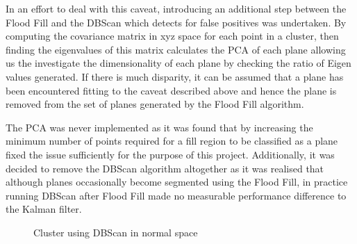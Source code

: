\documentclass[]{article}
\begin{document}
{In an effort to deal with this caveat, introducing an additional step between the Flood Fill and the DBScan which detects for false positives was undertaken. By computing the covariance matrix in xyz space for each point in a cluster, then finding the eigenvalues of this matrix calculates the PCA of each plane allowing us the investigate the dimensionality of each plane by checking the ratio of Eigen values generated. If there is much disparity, it can be assumed that a plane has been encountered fitting to the caveat described above and hence the plane is removed from the set of planes generated by the Flood Fill algorithm. 

The PCA was never implemented as it was found that by increasing the minimum number of points required for a fill region to be classified as a plane fixed the issue sufficiently for the purpose of this project. Additionally, it was decided to remove the DBScan algorithm altogether as it was realised that although planes occasionally become segmented using the Flood Fill, in practice running DBScan after Flood Fill made no measurable performance difference to the Kalman filter.





\begin{figure}[p]
	\centering     %
	\;

	\caption{Cluster using DBScan in normal space}
	\label{fig:box_normal_clustering}
\end{figure}

}
\end{document}

